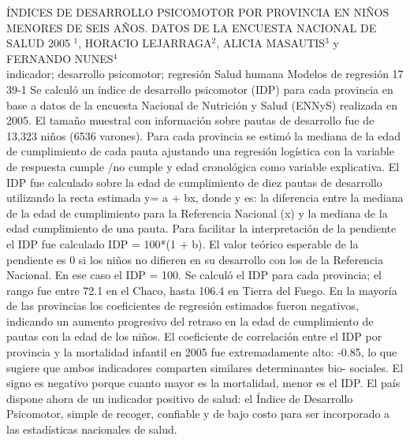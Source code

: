 \A
{ÍNDICES DE DESARROLLO PSICOMOTOR POR PROVINCIA EN NIÑOS MENORES DE SEIS AÑOS. DATOS DE LA ENCUESTA NACIONAL DE SALUD 2005}
{$^1$, HORACIO LEJARRAGA$^2$, ALICIA MASAUTIS$^3$ y FERNANDO NUNES$^4$}
{
\\}
{indicador; desarrollo psicomotor; regresión} 
 {Salud humana} 
 {Modelos de regresión} 
 {17} 
 {39-1}
{Se calculó un índice de desarrollo psicomotor (IDP) para cada provincia en base a datos de la encuesta Nacional de Nutrición y Salud (ENNyS) realizada en 2005. El tamaño muestral con información sobre pautas de desarrollo fue de 13,323 niños (6536 varones). Para cada provincia se estimó la mediana de la edad de cumplimiento de cada pauta ajustando una regresión logística con la variable de respuesta cumple /no cumple y edad cronológica como variable explicativa. El IDP fue calculado sobre la edad de cumplimiento de diez pautas de desarrollo utilizando la recta estimada y= a + bx, donde y es: la diferencia entre la mediana de la edad de cumplimiento para la Referencia Nacional (x) y la mediana de la edad cumplimiento de una pauta. Para facilitar la interpretación de la pendiente el IDP fue calculado IDP = 100*(1 + b). El valor teórico esperable de la pendiente es 0 si los niños no difieren en su desarrollo con los de la Referencia Nacional. En ese caso el IDP = 100. Se calculó el IDP para cada provincia; el rango fue entre 72.1 en el Chaco, hasta 106.4 en Tierra del Fuego. En la mayoría de las provincias los coeficientes de regresión estimados fueron negativos, indicando un aumento progresivo del retraso en la edad de cumplimiento de pautas con la edad de los niños. El coeficiente de correlación entre el IDP por provincia y la mortalidad infantil en 2005 fue extremadamente alto: -0.85, lo que sugiere que ambos indicadores comparten similares determinantes bio- sociales. El signo es negativo porque cuanto mayor es la mortalidad, menor es el IDP. El país dispone ahora de un indicador positivo de salud: el Índice de Desarrollo Psicomotor, simple de recoger, confiable y de bajo costo para ser incorporado a las estadísticas nacionales de salud. }
